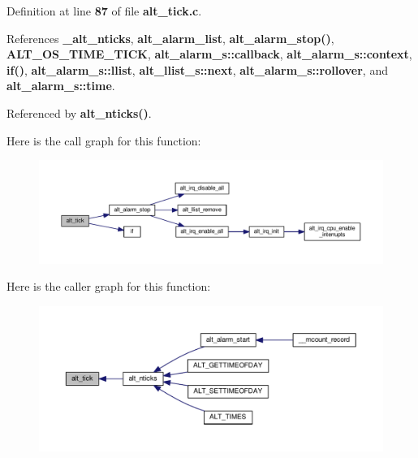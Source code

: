 Definition at line {\bf 87} of file {\bf alt\+\_\+tick.\+c}.



References {\bf \+\_\+alt\+\_\+nticks}, {\bf alt\+\_\+alarm\+\_\+list}, {\bf alt\+\_\+alarm\+\_\+stop()}, {\bf A\+L\+T\+\_\+\+O\+S\+\_\+\+T\+I\+M\+E\+\_\+\+T\+I\+CK}, {\bf alt\+\_\+alarm\+\_\+s\+::callback}, {\bf alt\+\_\+alarm\+\_\+s\+::context}, {\bf if()}, {\bf alt\+\_\+alarm\+\_\+s\+::llist}, {\bf alt\+\_\+llist\+\_\+s\+::next}, {\bf alt\+\_\+alarm\+\_\+s\+::rollover}, and {\bf alt\+\_\+alarm\+\_\+s\+::time}.



Referenced by {\bf alt\+\_\+nticks()}.



Here is the call graph for this function\+:
\nopagebreak
\begin{figure}[H]
\begin{center}
\leavevmode
\includegraphics[width=350pt]{dd/ddd/sys_2alt__alarm_8h_a8717d54d19301f7004086a20324a16ff_cgraph}
\end{center}
\end{figure}




Here is the caller graph for this function\+:
\nopagebreak
\begin{figure}[H]
\begin{center}
\leavevmode
\includegraphics[width=350pt]{dd/ddd/sys_2alt__alarm_8h_a8717d54d19301f7004086a20324a16ff_icgraph}
\end{center}
\end{figure}



